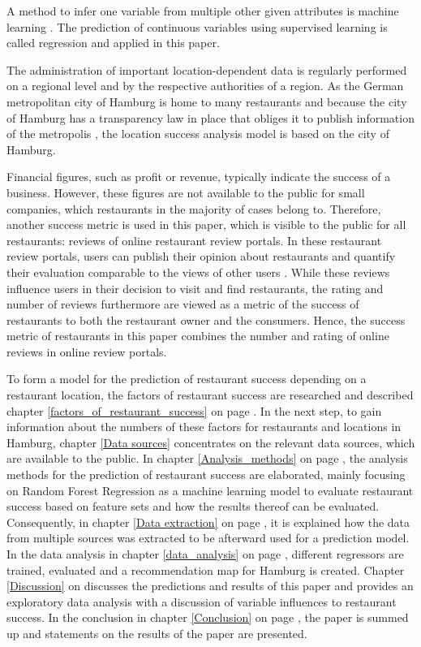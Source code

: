 \documentclass[a4paper, 11pt, oneside]{Thesis}  %
\begin{document}
A method to infer one variable from multiple other given attributes is machine learning \cite{Friedman.2001}. The prediction of continuous variables using supervised learning is called regression and applied in this paper.

The administration of important location-dependent data is regularly performed on a regional level and by the respective authorities of a region. As the German metropolitan city of Hamburg is home to many restaurants and because the city of Hamburg has a transparency law in place that obliges it to publish information of the metropolis \cite{Murjahn.2016}, the location success analysis model is based on the city of Hamburg.

Financial figures, such as profit or revenue, typically indicate the success of a business. However, these figures are not available to the public for small companies, which restaurants in the majority of cases belong to. Therefore, another success metric is used in this paper, which is visible to the public for all restaurants: reviews of online restaurant review portals. In these restaurant review portals, users can publish their opinion about restaurants and quantify their evaluation comparable to the views of other users \cite{Mellet.2014}. While these reviews influence users in their decision to visit and find restaurants, the rating and number of reviews furthermore are viewed as a metric of the success of restaurants to both the restaurant owner and the consumers. Hence, the success metric of restaurants in this paper combines the number and rating of online reviews in online review portals.

To form a model for the prediction of restaurant success depending on a restaurant location, the factors of restaurant success are researched and described chapter \ref{factors_of_restaurant_success} on page \pageref{factors_of_restaurant_success}. In the next step, to gain information about the numbers of these factors for restaurants and locations in Hamburg, chapter \ref{Data sources} concentrates on the relevant data sources, which are available to the public. In chapter \ref{Analysis_methods} on page \pageref{Analysis_methods}, the analysis methods for the prediction of restaurant success are elaborated, mainly focusing on Random Forest Regression as a machine learning model to evaluate restaurant success based on feature sets and how the results thereof can be evaluated. Consequently, in chapter \ref{Data extraction} on page \pageref{Data extraction}, it is explained how the data from multiple sources was extracted to be afterward used for a prediction model. In the data analysis in chapter \ref{data_analysis} on page \pageref{data_analysis}, different regressors are trained, evaluated and a recommendation map for Hamburg is created. Chapter \ref{Discussion} on \pageref{Discussion} discusses the predictions and results of this paper and provides an exploratory data analysis with a discussion of variable influences to restaurant success. In the conclusion in chapter \ref{Conclusion} on page \pageref{Conclusion}, the paper is summed up and statements on the results of the paper are presented. 
\end{document}
